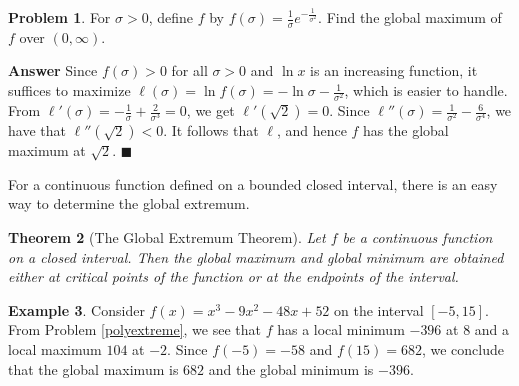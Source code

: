 \documentclass[12pt,letterpaper]{book}
\numberwithin{equation}{section}
\newtheorem{thm}{\textbf{Theorem}}[section]
\theoremstyle{definition}
\newtheorem{problem}[thm]{\textbf{Problem}}
\newtheorem{example}[thm]{\textbf{Example}}
\newenvironment{answer}{\noindent\textbf{Answer}}{\hfill$\blacksquare$\vspace{0.1in}}
\begin{document}
\begin{problem} For $\sigma>0$, define $f$ by $f(\sigma)=\frac{1}{\sigma}e^{-\frac{1}{\sigma^2}}$. Find the global maximum of $f$ over $(0,\infty)$.
\end{problem}

\begin{answer}
Since $f(\sigma)>0$ for all $\sigma>0$ and $\ln x$ is an increasing function, it suffices to maximize $\ell(\sigma)=\ln f(\sigma)=-\ln \sigma-\frac{1}{\sigma^2}$, which is easier to handle. From $\ell'(\sigma)=-\frac{1}{\sigma}+\frac{2}{\sigma^3}=0$, we get $\ell'(\sqrt{2})=0$. Since $\ell''(\sigma)=\frac{1}{\sigma^2}-\frac{6}{\sigma^4}$, we have that $\ell''(\sqrt{2})<0$. It follows that $\ell$, and hence $f$ has the global maximum at $\sqrt{2}$.
\end{answer}

For a continuous function defined on a bounded closed interval, there is an easy way to determine the global extremum.

\begin{thm}[The Global Extremum Theorem]\label{Global Extremum Theorem} Let $f$ be a continuous function on a closed interval. Then the global maximum and global minimum are obtained either at critical points of the function or at the endpoints of the interval.\end{thm}

\begin{example} Consider $f(x)=x^3-9x^2-48x+52$ on the interval $[-5,15]$. From Problem \ref{polyextreme}, we see that $f$ has a local minimum $-396$ at $8$ and a local maximum $104$ at $-2$. Since $f(-5)=-58$ and $f(15)=682$, we conclude that the global maximum is $682$ and the global minimum is $-396$.
\end{example}
\end{document}
